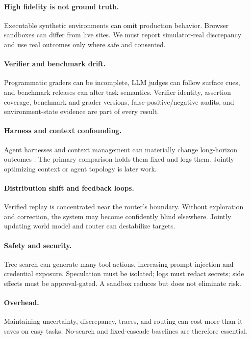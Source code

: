 \documentclass[10pt,twocolumn]{article}
\begin{document}
\paragraph{High fidelity is not ground truth.}
Executable synthetic environments can omit production behavior. Browser
sandboxes can differ from live sites. We must report simulator-real discrepancy
and use real outcomes only where safe and consented.

\paragraph{Verifier and benchmark drift.}
Programmatic graders can be incomplete, LLM judges can follow surface cues, and
benchmark releases can alter task semantics. Verifier identity, assertion
coverage, benchmark and grader versions, false-positive/negative audits, and
environment-state evidence are part of every result.

\paragraph{Harness and context confounding.}
Agent harnesses and context management can materially change long-horizon
outcomes \citep{lin2026context}. The primary comparison holds them fixed and
logs them. Jointly optimizing context or agent topology is later work.

\paragraph{Distribution shift and feedback loops.}
Verified replay is concentrated near the router's boundary. Without exploration
and correction, the system may become confidently blind elsewhere. Jointly
updating world model and router can destabilize targets.

\paragraph{Safety and security.}
Tree search can generate many tool actions, increasing prompt-injection and
credential exposure. Speculation must be isolated; logs must redact secrets;
side effects must be approval-gated. A sandbox reduces but does not eliminate
risk.

\paragraph{Overhead.}
Maintaining uncertainty, discrepancy, traces, and routing can cost more than it
saves on easy tasks. No-search and fixed-cascade baselines are therefore
essential.
\end{document}
